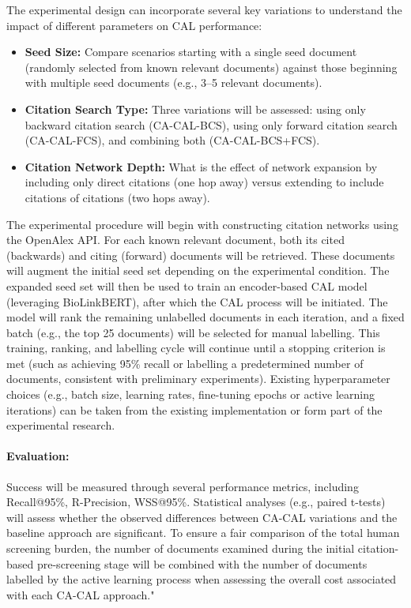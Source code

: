 \documentclass[10pt,oneside]{book}
\begin{document}
The experimental design can incorporate several key variations to understand the impact of different parameters on CAL performance:

\begin{itemize}
    \item \textbf{Seed Size:} Compare scenarios starting with a single seed document (randomly selected from known relevant documents) against those beginning with multiple seed documents (e.g., 3–5 relevant documents).
    \item \textbf{Citation Search Type:} Three variations will be assessed: using only backward citation search (CA-CAL-BCS), using only forward citation search (CA-CAL-FCS), and combining both (CA-CAL-BCS+FCS).
    \item \textbf{Citation Network Depth:} What is the effect of network expansion by including only direct citations (one hop away) versus extending to include citations of citations (two hops away).
\end{itemize}

The experimental procedure will begin with constructing citation networks using the OpenAlex API. For each known relevant document, both its cited (backwards) and citing (forward) documents will be retrieved. These documents will augment the initial seed set depending on the experimental condition. The expanded seed set will then be used to train an encoder-based CAL model (leveraging BioLinkBERT), after which the CAL process will be initiated. The model will rank the remaining unlabelled documents in each iteration, and a fixed batch (e.g., the top 25 documents) will be selected for manual labelling. This training, ranking, and labelling cycle will continue until a stopping criterion is met (such as achieving 95\% recall or labelling a predetermined number of documents, consistent with preliminary experiments). Existing hyperparameter choices (e.g., batch size, learning rates, fine-tuning epochs or active learning iterations) can be taken from the existing implementation or form part of the experimental research.

\paragraph{Evaluation: } Success will be measured through several performance metrics, including Recall@95\%, R-Precision, WSS@95\%. Statistical analyses (e.g., paired t-tests) will assess whether the observed differences between CA-CAL variations and the baseline approach are significant. To ensure a fair comparison of the total human screening burden, the number of documents examined during the initial citation-based pre-screening stage will be combined with the number of documents labelled by the active learning process when assessing the overall cost associated with each CA-CAL approach."
\end{document}
